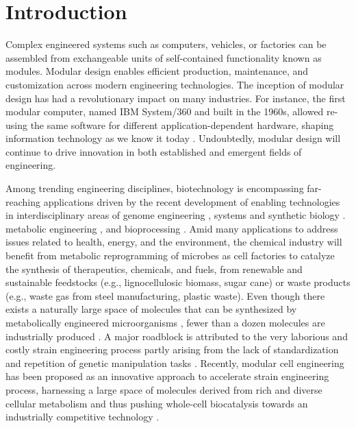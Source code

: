 

\section{Introduction}

Complex engineered systems such as computers, vehicles, or factories can be assembled from exchangeable units of self-contained functionality known as modules.
Modular design enables efficient production, maintenance, and customization across modern engineering technologies.
The inception of modular design has had a revolutionary impact on many industries.
For instance, the first modular computer, named IBM System/360 and built in the 1960s, allowed re-using the same software for different application-dependent hardware, shaping information technology as we know it today \citep{o2018}.
Undoubtedly, modular design will continue to drive innovation in both established and emergent fields of engineering.

Among trending engineering disciplines, biotechnology is encompassing far-reaching applications driven by the recent development of enabling technologies in interdisciplinary areas of genome engineering \citep{barrangou2016}, systems and synthetic biology \citep{kahl2013}.
metabolic engineering \citep{nielsen2016}, and bioprocessing \citep{cramer2011, olson2012}.
Amid many applications to address issues related to health, energy, and the environment, the chemical industry will benefit from metabolic reprogramming of microbes as cell factories to catalyze the synthesis of therapeutics, chemicals, and fuels, from renewable and sustainable feedstocks (e.g., lignocellulosic biomass, sugar cane) or waste products (e.g., waste gas from steel manufacturing, plastic waste).
Even though there exists a naturally large space of molecules that can be synthesized by metabolically engineered microorganisms \citep{lee2019}, fewer than a dozen molecules are industrially produced \citep{nielsen2016}.
A major roadblock is attributed to the very laborious and costly strain engineering process partly arising from the lack of standardization and repetition of genetic manipulation tasks \citep{king2017, winkler2015}.
Recently, modular cell engineering has been proposed as an innovative approach to accelerate strain engineering process, harnessing a large space of molecules derived from rich and diverse cellular metabolism and thus pushing whole-cell biocatalysis towards an industrially competitive technology \citep{trinh2016}.

